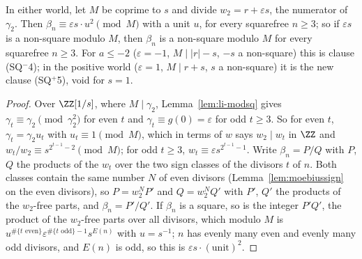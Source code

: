 \begin{lemma}
  \label{lem:rat-g2}
  \leanok
  In either world, let $M$ be coprime to $s$ and divide $w_2 = r + \varepsilon s$, the numerator
  of $\gamma_2$. Then $\beta_n \equiv \varepsilon s \cdot u^2 \pmod M$ with a unit $u$, for
  every squarefree $n \ge 3$; so if $\varepsilon s$ is a non-square modulo $M$, then $\beta_n$ is
  a non-square modulo $M$ for every squarefree $n \ge 3$. For $a \le -2$ ($\varepsilon = -1$,
  $M \mid |r| - s$, $-s$ a non-square) this is clause (SQ${}^-$4); in the positive world
  ($\varepsilon = 1$, $M \mid r + s$, $s$ a non-square) it is the new clause (SQ${}^+$5), void
  for $s = 1$.
\end{lemma}
\begin{proof}
  \leanok
  Over $\ZZ[1/s]$, where $M \mid \gamma_2$, Lemma~\ref{lem:li-modsq} gives $\gamma_t \equiv
  \gamma_2 \pmod{\gamma_2^2}$ for even $t$ and $\gamma_t \equiv g(0) = \varepsilon$ for odd
  $t \ge 3$. So for even $t$, $\gamma_t = \gamma_2 u_t$ with $u_t \equiv 1 \pmod M$, which in
  terms of $w$ says $w_2 \mid w_t$ in $\ZZ$ and $w_t / w_2 \equiv s^{2^{t-1} - 2} \pmod M$;
  for odd $t \ge 3$, $w_t \equiv \varepsilon s^{2^{t-1}-1}$. Write $\beta_n = P/Q$ with $P$,
  $Q$ the products of the $w_t$ over the two sign classes of the divisors $t$ of $n$. Both classes
  contain the same number $N$ of even divisors (Lemma~\ref{lem:moebiussign} on the even
  divisors), so $P = w_2^N P'$ and $Q = w_2^N Q'$ with $P'$, $Q'$ the products of the $w_2$-free
  parts, and $\beta_n = P'/Q'$. If $\beta_n$ is a square, so is the integer $P'Q'$, the product
  of the $w_2$-free parts over all divisors, which modulo $M$ is $u^{\#\{t \text{ even}\}}
  \varepsilon^{\#\{t \text{ odd}\} - 1} s^{E(n)}$ with $u = s^{-1}$; $n$ has evenly many even
  and evenly many odd divisors, and $E(n)$ is odd, so this is $\varepsilon s \cdot
  (\text{unit})^2$.
\end{proof}

